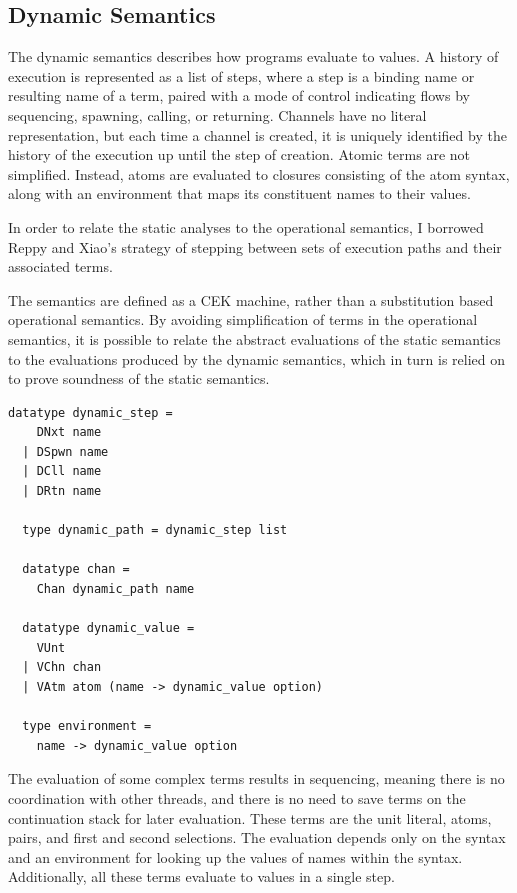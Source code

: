 \documentclass[10pt]{article}
\begin{document}
\subsection{Dynamic Semantics}
The dynamic semantics describes how programs evaluate to values.
A history of execution is represented as a list of steps, where a step is a
binding name or resulting name of a term, paired with a mode of control indicating
flows by sequencing, spawning, calling, or returning.
Channels have no literal representation, but each
time a channel is created, it is uniquely identified by the history of the execution up until
the step of creation. Atomic terms are not simplified. Instead, atoms are evaluated to
closures consisting of the atom syntax, along with an environment that maps its
constituent names to their values.

In order to relate the static analyses to the operational semantics, I
borrowed Reppy and Xiao's strategy of stepping between sets of execution paths and
their associated terms.

The semantics are defined as a CEK machine, rather than a
substitution based operational semantics. By avoiding simplification of terms in the
operational semantics, it is possible to relate
the abstract evaluations of the static semantics to the
evaluations produced by the dynamic semantics,
which in turn is relied on to prove soundness of the static semantics.


\begin{lstlisting}[language=logic]
  datatype dynamic_step =
    DNxt name
  | DSpwn name
  | DCll name
  | DRtn name 

  type dynamic_path = dynamic_step list

  datatype chan =
    Chan dynamic_path name 

  datatype dynamic_value = 
    VUnt
  | VChn chan
  | VAtm atom (name -> dynamic_value option)

  type environment =
    name -> dynamic_value option
\end{lstlisting}

The evaluation of some complex terms results in sequencing, meaning there is no coordination
with other threads, and there is no need to save terms on
the continuation stack for later evaluation. These terms are the
unit literal, atoms, pairs, and first and second selections. The evaluation depends only
on the syntax and an environment for looking up the values of names within the syntax.
Additionally, all these terms evaluate to values in a single step.
\end{document}

